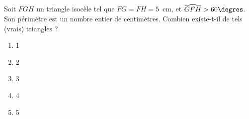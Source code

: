Soit $FGH$ un triangle isocèle tel que $FG = FH = 5$~cm, et $\widehat{GFH}>60\degres$. Son périmètre est un nombre entier de centimètres. Combien existe-t-il de tels (vrais) triangles ?
\begin{multicols}{5}
  \begin{enumerate}[A/]
  \item 1
  \item 2
  \item 3
  \item 4
  \item 5
  \end{enumerate}
\end{multicols}